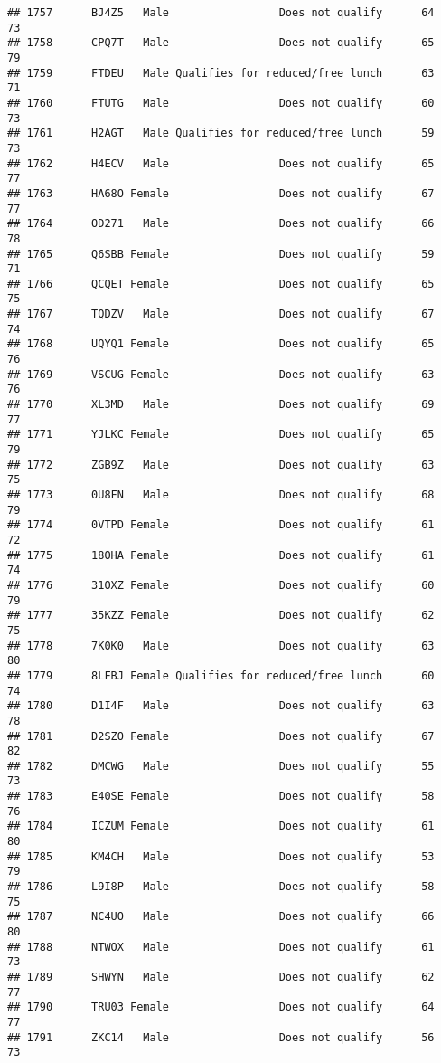 \documentclass[
]{article}
\begin{document}
\begin{verbatim}
## 1757      BJ4Z5   Male                 Does not qualify      64       73
## 1758      CPQ7T   Male                 Does not qualify      65       79
## 1759      FTDEU   Male Qualifies for reduced/free lunch      63       71
## 1760      FTUTG   Male                 Does not qualify      60       73
## 1761      H2AGT   Male Qualifies for reduced/free lunch      59       73
## 1762      H4ECV   Male                 Does not qualify      65       77
## 1763      HA68O Female                 Does not qualify      67       77
## 1764      OD271   Male                 Does not qualify      66       78
## 1765      Q6SBB Female                 Does not qualify      59       71
## 1766      QCQET Female                 Does not qualify      65       75
## 1767      TQDZV   Male                 Does not qualify      67       74
## 1768      UQYQ1 Female                 Does not qualify      65       76
## 1769      VSCUG Female                 Does not qualify      63       76
## 1770      XL3MD   Male                 Does not qualify      69       77
## 1771      YJLKC Female                 Does not qualify      65       79
## 1772      ZGB9Z   Male                 Does not qualify      63       75
## 1773      0U8FN   Male                 Does not qualify      68       79
## 1774      0VTPD Female                 Does not qualify      61       72
## 1775      18OHA Female                 Does not qualify      61       74
## 1776      31OXZ Female                 Does not qualify      60       79
## 1777      35KZZ Female                 Does not qualify      62       75
## 1778      7K0K0   Male                 Does not qualify      63       80
## 1779      8LFBJ Female Qualifies for reduced/free lunch      60       74
## 1780      D1I4F   Male                 Does not qualify      63       78
## 1781      D2SZO Female                 Does not qualify      67       82
## 1782      DMCWG   Male                 Does not qualify      55       73
## 1783      E40SE Female                 Does not qualify      58       76
## 1784      ICZUM Female                 Does not qualify      61       80
## 1785      KM4CH   Male                 Does not qualify      53       79
## 1786      L9I8P   Male                 Does not qualify      58       75
## 1787      NC4UO   Male                 Does not qualify      66       80
## 1788      NTWOX   Male                 Does not qualify      61       73
## 1789      SHWYN   Male                 Does not qualify      62       77
## 1790      TRU03 Female                 Does not qualify      64       77
## 1791      ZKC14   Male                 Does not qualify      56       73

\end{verbatim}
\end{document}
